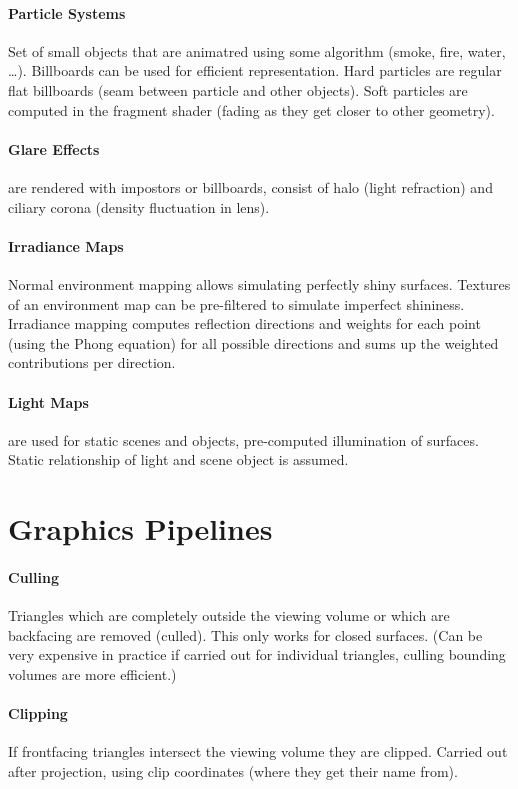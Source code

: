 \documentclass{article}
\begin{document}
\paragraph{Particle Systems} Set of small objects that are animatred using some algorithm (smoke, fire, water, \ldots). Billboards can be used for efficient representation. Hard particles are regular flat billboards (seam between particle and other objects). Soft particles are computed in the fragment shader (fading as they get closer to other geometry).

\paragraph{Glare Effects} are rendered with impostors or billboards, consist of halo (light refraction) and ciliary corona (density fluctuation in lens).

\paragraph{Irradiance Maps} Normal environment mapping allows simulating perfectly shiny surfaces. Textures of an environment map can be pre-filtered to simulate imperfect shininess. Irradiance mapping computes reflection directions and weights for each point (using the Phong equation) for all possible directions and sums up the weighted contributions per direction.

\paragraph{Light Maps} are used for static scenes and objects, pre-computed illumination of surfaces. Static relationship of light and scene object is assumed.

\section{Graphics Pipelines} 

\paragraph{Culling} Triangles which are completely outside the viewing volume or which are backfacing are removed (culled). This only works for closed surfaces. (Can be very expensive in practice if carried out for individual triangles, culling bounding volumes are more efficient.)

\paragraph{Clipping} If frontfacing triangles intersect the viewing volume they are clipped. Carried out after projection, using clip coordinates (where they get their name from).
\end{document}
